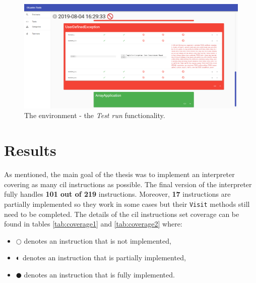 \documentclass[declaration,shortabstract,english,mgr]{iithesis}
\begin{document}
\begin{figure}
	\includegraphics[width=1\textwidth]{tools_run.png}
    \centering
    \caption{The environment - the \textit{Test run} functionality.}
    \label{fig:tools_run}
\end{figure}

\clearpage


\chapter{Results}
\label{sec:results}

As mentioned, the main goal of the thesis was to implement an interpreter covering as many \acrshort{cil} instructions as possible. The final version of the interpreter fully handles \textbf{101 out of 219} instructions. Moreover, \textbf{17} instructions are partially implemented so they work in some cases but their \texttt{Visit} methods still need to be completed. The details of the \acrshort{cil} instructions set coverage can be found in tables \ref{tab:coverage1} and \ref{tab:coverage2} where:
\begin{itemize}
	\item{$\Circle$ denotes an instruction that is not implemented,}
	\item{$\LEFTcircle$ denotes an instruction that is partially implemented,}
	\item{$\CIRCLE$ denotes an instruction that is fully implemented.}
\end{itemize}
\end{document}

